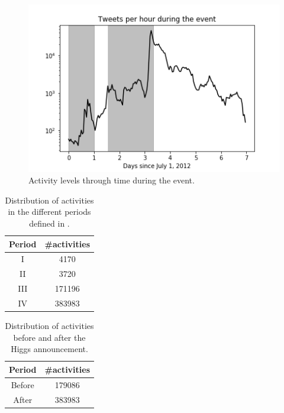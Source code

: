 \documentclass[sigconf]{acmart}
\begin{document}
\begin{figure}[htbp]
\begin{center}
\includegraphics[width=\linewidth]{Figures/tweetsperhour.png}
\caption{Activity levels through time during the event.}
\label{tweetsperhour}
\end{center}
\end{figure}

\begin{table}[htp]
\caption{Distribution of activities in the different periods defined in \cite{rodriguez2012influence}.}
\begin{center}
\begin{tabular}{|c|c|}
\hline
 Period & \#activities \\
\hline
 I      & 4170  \\
 II    & 3720   \\    
 III   & 171196   \\   
 IV &   383983 \\
 \hline
\end{tabular}
\end{center}
\label{activityperiod}
\end{table}

\begin{table}[htp]
\caption{Distribution of activities before and after the Higgs announcement.}
\begin{center}
\begin{tabular}{|c|c|}
\hline
 Period & \#activities \\
\hline
Before & 179086 \\
After & 383983 \\
\hline
\end{tabular}
\end{center}
\label{activityperiod}
\end{table}
\end{document}
